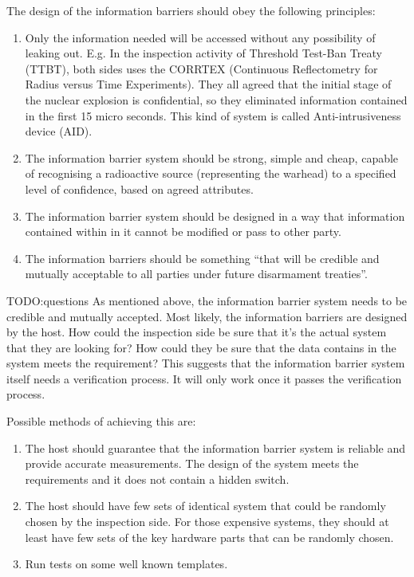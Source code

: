 \documentclass[twoside,titlepage,11pt,twocolumn,a4paper]{article}
\begin{document}
The design of the information barriers should obey the following
principles:
\begin{enumerate}
  \item Only the information needed will be accessed without any
    possibility of leaking out. E.g. In the inspection activity of
    Threshold Test-Ban Treaty (TTBT), both sides uses the CORRTEX
    (Continuous Reflectometry for Radius versus Time
    Experiments). \citep{deupree1981} They all agreed that the initial
    stage of the nuclear explosion is confidential, so they eliminated
    information contained in the first 15 micro seconds. This kind of
    system is called Anti-intrusiveness device (AID).
  \item The information barrier system should be strong, simple and
    cheap, capable of recognising a radioactive source (representing
    the warhead) to a specified level of confidence, based on agreed
    attributes.
  \item The information barrier system should be designed in a way
    that information contained within in it cannot be modified or pass
    to other party.
  \item The information barriers should be something ``that will be
    credible and mutually acceptable to all parties under future
    disarmament treaties''. \citep{shultz2007}
\end{enumerate}

TODO:questions
As mentioned above, the information barrier system
needs to be credible and mutually accepted. Most likely, the
information barriers are designed by the host. How could the
inspection side be sure that it's the actual system that they are
looking for? How could they be sure that the data contains in the
system meets the requirement? This suggests that the information
barrier system itself needs a verification process. It will only work
once it passes the verification process.

Possible methods of achieving this are:
\begin{enumerate}
  \item The host should guarantee that the information barrier system
    is reliable and provide accurate measurements. The design of the
    system meets the requirements and it does not contain a hidden
    switch.
  \item The host should have few sets of identical system that could
    be randomly chosen by the inspection side. For those expensive
    systems, they should at least have few sets of the key hardware
    parts that can be randomly chosen.
  \item Run tests on some well known templates.
\end{enumerate}
\end{document}
